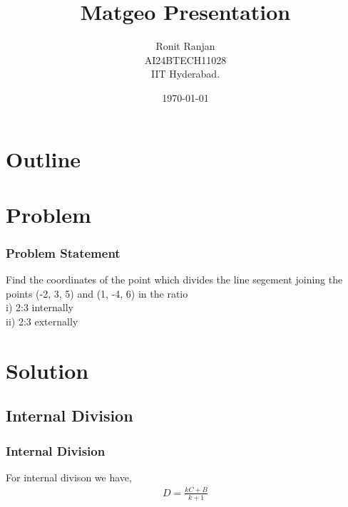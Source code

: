 \documentclass{beamer}
\title{Matgeo Presentation}
\author{Ronit Ranjan \\ AI24BTECH11028\\IIT Hyderabad.}
\date{\today}
\theoremstyle{remark}
\numberwithin{equation}{section}
\begin{document}
\begin{frame}
\titlepage
\end{frame}

\section*{Outline}
\begin{frame}
\tableofcontents
\end{frame}
\section{Problem}
\begin{frame}
\frametitle{Problem Statement}

Find the coordinates of the point which divides the line segement joining the points (-2, 3, 5) and (1, -4, 6) in the ratio\\
i) 2:3 internally\\
ii) 2:3 externally
\end{frame}


\section{Solution}
\subsection{Internal Division}
\begin{frame}
\frametitle{Internal Division}

For internal divison we have,
\begin{align}
    D = \frac{kC + B}{k + 1}
\end{align}
\begin{table}[h]
    \centering
    
\end{table}
\end{frame}
\end{document}
